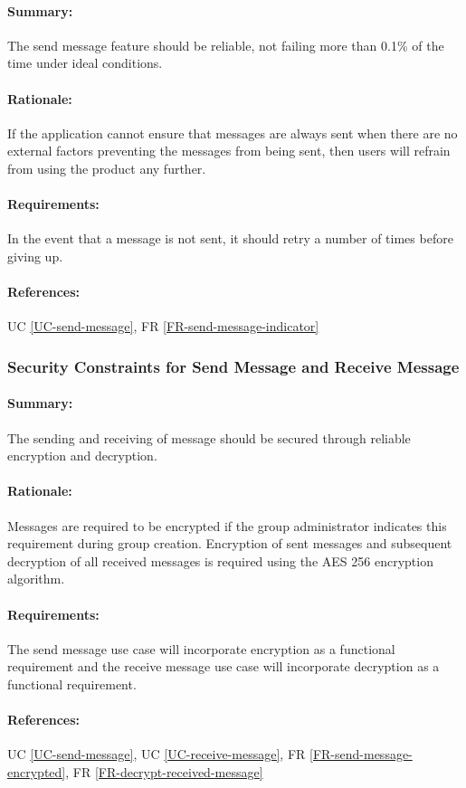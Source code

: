 \documentclass[11pt]{article}
\begin{document}
\paragraph{Summary:} The send message feature should be reliable, not failing more than 0.1\% of the time under ideal conditions.
\paragraph{Rationale:} If the application cannot ensure that messages are always sent when there are no external factors preventing the messages from being sent, then users will refrain from using the product any further.
\paragraph{Requirements:} In the event that a message is not sent, it should retry a number of times before giving up.
\paragraph{References:} UC \ref{UC-send-message}, FR \ref{FR-send-message-indicator}

\subsubsection{Security Constraints for Send Message and Receive Message} \label{NFR-security-send-message-and-receive-message}
\paragraph{Summary:} The sending and receiving of message should be secured through reliable encryption and decryption.
\paragraph{Rationale:} Messages are required to be encrypted if the group administrator indicates this requirement during group creation. Encryption of sent messages and subsequent decryption of all received messages is required using the AES 256 encryption algorithm. 
\paragraph{Requirements:} The send message use case will incorporate encryption as a functional requirement and the receive message use case will incorporate decryption as a functional requirement.
\paragraph{References:} UC \ref{UC-send-message}, UC \ref{UC-receive-message}, FR \ref{FR-send-message-encrypted}, FR \ref{FR-decrypt-received-message}
\end{document}
